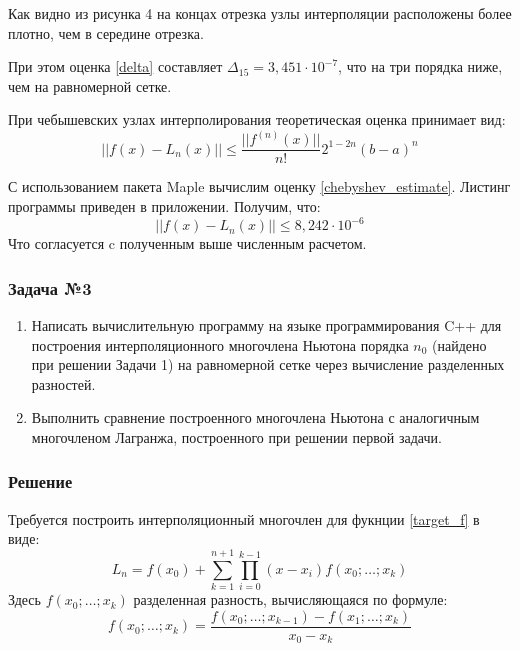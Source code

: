 \documentclass[a4paper, fontsize=14pt]{article}
\begin{document}
    Как видно из рисунка 4 на концах отрезка узлы интерполяции расположены более плотно, чем в середине отрезка. 

    При этом оценка \eqref{delta} составляет $\Delta_{15} = 3,451 \cdot 10^{-7}$, что на  три порядка ниже, чем на равномерной сетке.
    
    При чебышевских узлах интерполирования теоретическая оценка принимает вид:
    \begin{equation}
        \label{chebyshev_estimate}
        || f(x) - L_n(x) || \leq \frac{|| f^{(n)}(x) ||}{n!} 2^{1-2n} (b-a)^n
    \end{equation}

    С использованием пакета Maple вычислим оценку \eqref{chebyshev_estimate}. Листинг программы приведен в приложении.
    Получим, что:
    \begin{equation*}
        || f(x) - L_n(x) || \leq 8,242 \cdot 10^{-6}
    \end{equation*}
    Что согласуется c полученным выше численным расчетом.
    \subsubsection*{Задача №3}
    \begin{enumerate}
        \item Написать вычислительную программу на языке программирования C++ для построения интерполяционного многочлена Ньютона порядка $n_0$ (найдено при решении Задачи 1) на равномерной сетке через вычисление разделенных разностей.
        \item Выполнить сравнение построенного многочлена Ньютона с аналогичным многочленом Лагранжа, построенного при решении первой задачи.
    \end{enumerate}
    \subsubsection*{Решение}
    Требуется построить интерполяционный многочлен для фукнции \eqref{target_f} в виде:
    \begin{equation*}
        L_n = f(x_0) + \sum_{k=1}^{n+1} \prod_{i=0}^{k-1} (x-x_i) f(x_0; \dots; x_k)
    \end{equation*}
    Здесь $f(x_0; \dots;x_k)$ разделенная разность, вычисляющаяся по формуле:
    \begin{equation*}
        f(x_0; \dots;x_k) = \frac{f(x_0; \dots;x_{k-1}) - f(x_1; \dots;x_k)}{x_0 - x_k}
    \end{equation*}
\end{document}
